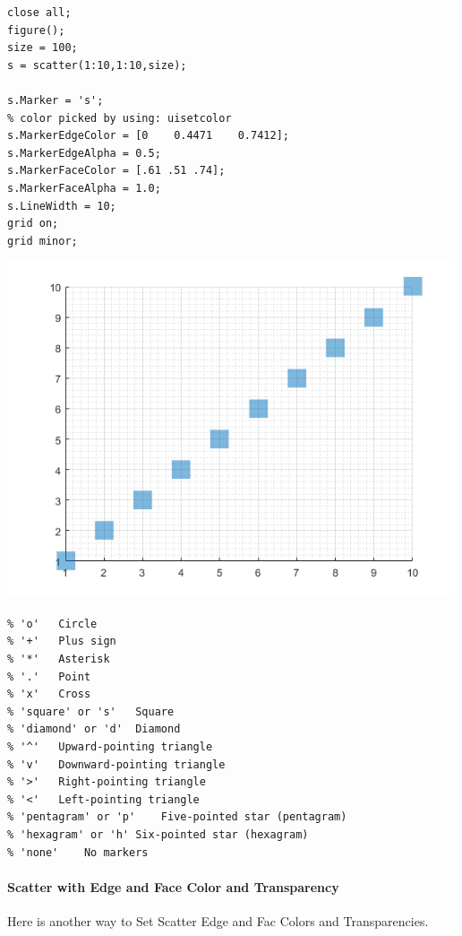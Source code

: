 \documentclass[
]{book}
\begin{document}
\begin{verbatim}
close all;
figure();
size = 100;
s = scatter(1:10,1:10,size);

s.Marker = 's';
% color picked by using: uisetcolor
s.MarkerEdgeColor = [0    0.4471    0.7412];
s.MarkerEdgeAlpha = 0.5;
s.MarkerFaceColor = [.61 .51 .74];
s.MarkerFaceAlpha = 1.0;
s.LineWidth = 10;
grid on;
grid minor;
\end{verbatim}

\includegraphics[width=5.20833in,height=\textheight]{img/fs_scatter_images/figure_0.png}

\begin{verbatim}
% 'o'   Circle
% '+'   Plus sign
% '*'   Asterisk
% '.'   Point
% 'x'   Cross
% 'square' or 's'   Square
% 'diamond' or 'd'  Diamond
% '^'   Upward-pointing triangle
% 'v'   Downward-pointing triangle
% '>'   Right-pointing triangle
% '<'   Left-pointing triangle
% 'pentagram' or 'p'    Five-pointed star (pentagram)
% 'hexagram' or 'h' Six-pointed star (hexagram)
% 'none'    No markers
\end{verbatim}

\hypertarget{scatter-with-edge-and-face-color-and-transparency}{%
\paragraph{Scatter with Edge and Face Color and Transparency}\label{scatter-with-edge-and-face-color-and-transparency}}

Here is another way to Set Scatter Edge and Fac Colors and
Transparencies.
\end{document}
